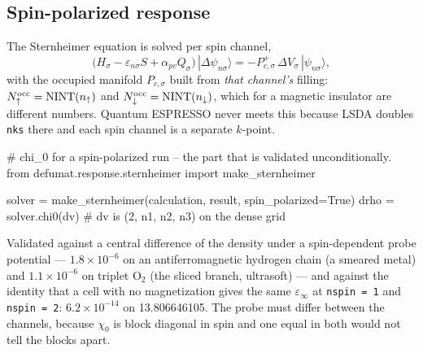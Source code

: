 \documentclass[11pt,a4paper]{article}
\newcommand{\code}[1]{\texttt{\small #1}}
\begin{document}
\subsection{Spin-polarized response}

The Sternheimer equation is solved per spin channel,
\begin{equation*}
  \bigl(H_\sigma - \varepsilon_{n\sigma} S + \alpha_{pv} Q_\sigma\bigr)
  \,|\Delta\psi_{n\sigma}\rangle
  = -P^{+}_{c,\sigma}\,\Delta V_\sigma\,|\psi_{n\sigma}\rangle ,
\end{equation*}
with the occupied manifold $P_{c,\sigma}$ built from \emph{that channel's}
filling: $N^{\rm occ}_\uparrow = \mathrm{NINT}(n_\uparrow)$ and
$N^{\rm occ}_\downarrow = \mathrm{NINT}(n_\downarrow)$, which for a magnetic
insulator are different numbers. Quantum ESPRESSO never meets this because LSDA
doubles \code{nks} there and each spin channel is a separate $k$-point.

\begin{pycode}
# chi_0 for a spin-polarized run -- the part that is validated unconditionally.
from defumat.response.sternheimer import make_sternheimer

solver = make_sternheimer(calculation, result, spin_polarized=True)
drho = solver.chi0(dv)          # dv is (2, n1, n2, n3) on the dense grid
\end{pycode}

Validated against a central difference of the density under a spin-dependent
probe potential --- $1.8\times10^{-6}$ on an antiferromagnetic hydrogen chain (a
smeared metal) and $1.1\times10^{-6}$ on triplet O$_2$ (the sliced branch,
ultrasoft) --- and against the identity that a cell with no magnetization gives
the same $\varepsilon_\infty$ at \code{nspin = 1} and \code{nspin = 2}:
$6.2\times10^{-14}$ on 13.806646105. The probe must differ between the channels,
because $\chi_0$ is block diagonal in spin and one equal in both would not tell
the blocks apart.
\end{document}
